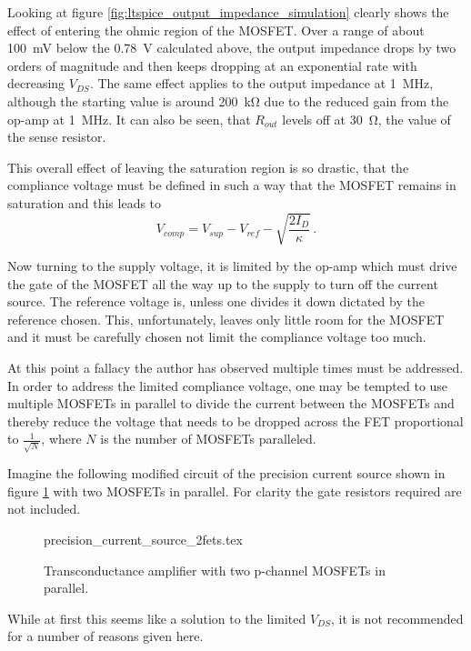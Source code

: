Looking at figure \ref{fig:ltspice_output_impedance_simulation} clearly shows the effect of entering the ohmic region of the MOSFET. Over a range of about \qty{100}{\mV} below the \qty{0.78}{\V} calculated above, the output impedance drops by two orders of magnitude and then keeps dropping at an exponential rate with decreasing $V_{DS}$. The same effect applies to the output impedance at \qty{1}{\MHz}, although the starting value is around \qty{200}{\kilo\ohm} due to the reduced gain from the op-amp at \qty{1}{\MHz}. It can also be seen, that $R_{out}$ levels off at \qty{30}{\ohm}, the value of the sense resistor.

This overall effect of leaving the saturation region is so drastic, that the compliance voltage must be defined in such a way that the MOSFET remains in saturation and this leads to
\begin{equation}
    V_{comp} = V_{sup} - V_{ref} - \sqrt{\frac{2 I_D}{\kappa}} \,.
\end{equation}

Now turning to the supply voltage, it is limited by the op-amp which must drive the gate of the MOSFET all the way up to the supply to turn off the current source. The reference voltage is, unless one divides it down dictated by the reference chosen. This, unfortunately, leaves only little room for the MOSFET and it must be carefully chosen not limit the compliance voltage too much.

At this point a fallacy the author has observed multiple times must be addressed. In order to address the limited compliance voltage, one may be tempted to use multiple MOSFETs in parallel to divide the current between the MOSFETs and thereby reduce the voltage that needs to be dropped across the FET proportional to $\frac{1}{\sqrt{N}}$, where $N$ is the number of MOSFETs paralleled.

Imagine the following modified circuit of the precision current source shown in figure \ref{fig:precision_current_source_two_mosfets} with two MOSFETs in parallel. For clarity the gate resistors required are not included.

\begin{figure}[ht]
    \centering
    {precision_current_source_2fets.tex}
    \caption{Transconductance amplifier with two p-channel MOSFETs in parallel.}
    \label{fig:precision_current_source_two_mosfets}
\end{figure}

While at first this seems like a solution to the limited $V_{DS}$, it is not recommended for a number of reasons given here.

